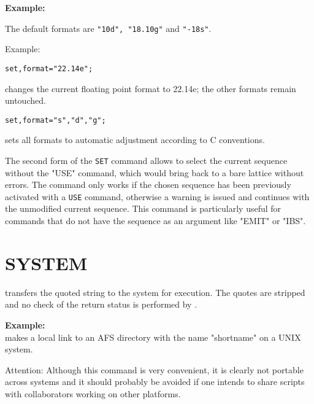 {\bf Example:}\\



The default formats are {\tt "10d", "18.10g"} and {\tt "-18s"}.

Example: 
\begin{verbatim}
set,format="22.14e";
\end{verbatim} 
changes the current floating point format to 22.14e; the other formats remain untouched. 
\begin{verbatim}
set,format="s","d","g";
\end{verbatim} 
sets all formats to automatic adjustment according to C conventions. 



The second form of the {\tt SET} command allows to select the
current sequence without the "USE" command, which would
bring back to a bare lattice without errors. The command only works
if the chosen sequence has been previously activated with a {\tt USE} command,
otherwise a warning is issued and \madx continues with the
unmodified current sequence. This command is particularly useful for
commands that do not have the sequence as an argument like "EMIT" or
"IBS". 



\section{SYSTEM}
\label{sec:system}
transfers the quoted string to the system for execution. The quotes are
stripped and no check of the return status is performed by \madx.

{\bf Example:}\\ 
makes a local link to an AFS directory with the name "shortname" on a
UNIX system. 

Attention: Although this command is very convenient, it is clearly not portable
across systems and it should probably be avoided if one intends to share \madx 
scripts with collaborators working on other platforms. 

